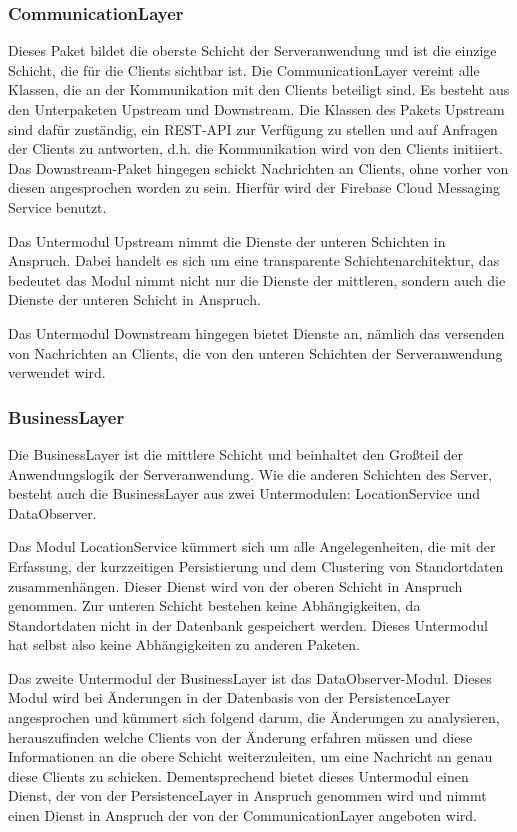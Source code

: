 \documentclass[11pt,a4paper]{article}
\begin{document}
\subsubsection{CommunicationLayer}
Dieses Paket bildet die oberste Schicht der Serveranwendung und ist die einzige Schicht, die für die Clients sichtbar ist. Die CommunicationLayer vereint alle Klassen, die an der Kommunikation mit den Clients beteiligt sind. Es besteht aus den Unterpaketen Upstream und Downstream. Die Klassen des Pakets Upstream sind dafür zuständig, ein REST-API zur Verfügung zu stellen und auf Anfragen der Clients zu antworten, d.h. die Kommunikation wird von den Clients initiiert. Das Downstream-Paket hingegen schickt Nachrichten an Clients, ohne vorher von diesen angesprochen worden zu sein. Hierfür wird der Firebase Cloud Messaging Service benutzt.

Das Untermodul Upstream nimmt die Dienste der unteren Schichten in Anspruch. Dabei handelt es sich um eine transparente Schichtenarchitektur, das bedeutet das Modul nimmt nicht nur die Dienste der mittleren, sondern auch die Dienste der unteren Schicht in Anspruch.

Das Untermodul Downstream hingegen bietet Dienste an, nämlich das versenden von Nachrichten an Clients, die von den unteren Schichten der Serveranwendung verwendet wird.

\subsubsection{BusinessLayer}
Die BusinessLayer ist die mittlere Schicht und beinhaltet den Großteil der Anwendungslogik der Serveranwendung. Wie die anderen Schichten des Server, besteht auch die BusinessLayer aus zwei Untermodulen: LocationService und DataObserver.

Das Modul LocationService kümmert sich um alle Angelegenheiten, die mit der Erfassung, der kurzzeitigen Persistierung und dem Clustering von Standortdaten zusammenhängen. Dieser Dienst wird von der oberen Schicht in Anspruch genommen. Zur unteren Schicht bestehen keine Abhängigkeiten, da Standortdaten nicht in der Datenbank gespeichert werden. Dieses Untermodul hat selbst also keine Abhängigkeiten zu anderen Paketen.

Das zweite Untermodul der BusinessLayer ist das DataObserver-Modul. Dieses Modul wird bei Änderungen in der Datenbasis von der PersistenceLayer angesprochen und kümmert sich folgend darum, die Änderungen zu analysieren, herauszufinden welche Clients von der Änderung erfahren müssen und diese Informationen an die obere Schicht weiterzuleiten, um eine Nachricht an genau diese Clients zu schicken. Dementsprechend bietet dieses Untermodul einen Dienst, der von der PersistenceLayer in Anspruch genommen wird und nimmt einen Dienst in Anspruch der von der CommunicationLayer angeboten wird.
\end{document}
